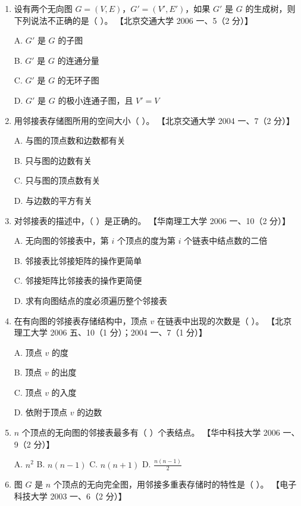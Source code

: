 \documentclass[lang=cn,newtx,10pt,scheme=chinese]{../../elegantbook}
\begin{document}
\begin{enumerate}
        \item 设有两个无向图 $G = (V, E)$，$G' = (V', E')$，如果 $G'$ 是 $G$ 的生成树，则下列说法不正确的是（ ）。  
        【北京交通大学 2006 一、5（2 分）】  

        A. $G'$ 是 $G$ 的子图  

        B. $G'$ 是 $G$ 的连通分量  

        C. $G'$ 是 $G$ 的无环子图  

        D. $G'$ 是 $G$ 的极小连通子图，且 $V' = V$  
    
        \item 用邻接表存储图所用的空间大小（ ）。  
        【北京交通大学 2004 一、7（2 分）】 

        A. 与图的顶点数和边数都有关  

        B. 只与图的边数有关  

        C. 只与图的顶点数有关  

        D. 与边数的平方有关 

        \item 对邻接表的描述中，（ ）是正确的。  
        【华南理工大学 2006 一、10（2 分）】  

        A. 无向图的邻接表中，第 $i$ 个顶点的度为第 $i$ 个链表中结点数的二倍  

        B. 邻接表比邻接矩阵的操作更简单  

        C. 邻接矩阵比邻接表的操作更简便  

        D. 求有向图结点的度必须遍历整个邻接表  
    
        \item 在有向图的邻接表存储结构中，顶点 $v$ 在链表中出现的次数是（ ）。  
        【北京理工大学 2006 五、10（1 分）；2004 一、7（1 分）】  

        A. 顶点 $v$ 的度  

        B. 顶点 $v$ 的出度  

        C. 顶点 $v$ 的入度  

        D. 依附于顶点 $v$ 的边数  
    
        \item $n$ 个顶点的无向图的邻接表最多有（ ）个表结点。  
        【华中科技大学 2006 一、9（2 分）】  

        A. $n^2$ \quad B. $n(n-1)$ \quad C. $n(n+1)$ \quad D. $\frac{n(n-1)}{2}$  
    
        \item 图 $G$ 是 $n$ 个顶点的无向完全图，用邻接多重表存储时的特性是（ ）。  
        【电子科技大学 2003 一、6（2 分）】  


\end{enumerate}
\end{document}
